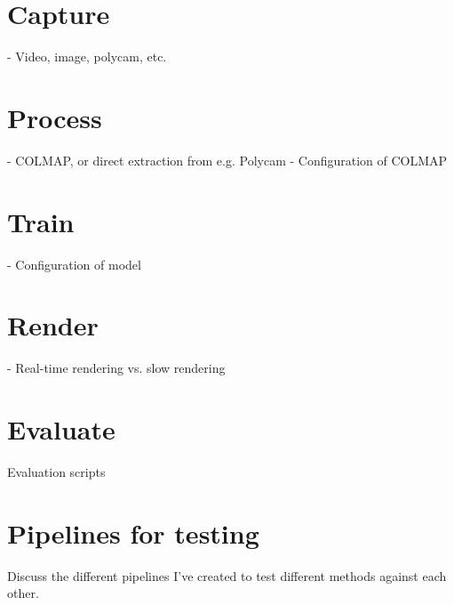 



\section{Capture}
- Video, image, polycam, etc.


\section{Process}
- COLMAP, or direct extraction from e.g. Polycam
- Configuration of COLMAP


\section{Train}
- Configuration of model


\section{Render}
- Real-time rendering vs. slow rendering


\section{Evaluate}
Evaluation scripts


\section{Pipelines for testing}
Discuss the different pipelines I've created to test different methods against each other.